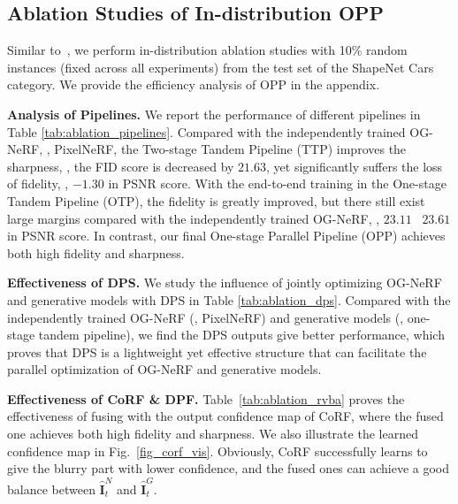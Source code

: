\subsection{\textbf{Ablation Studies of In-distribution OPP}}

\label{sec:ablation_OPP}
Similar to~\cite {PixelNeRF_yu2021pixelnerf}, we perform in-distribution ablation studies with 10\% random instances (fixed across all experiments) from the test set of the ShapeNet Cars category. We provide the efficiency analysis of OPP in the appendix.

\vspace{0.1cm}
\noindent\textbf{Analysis of Pipelines.}
We report the performance of different pipelines in Table \ref{tab:ablation_pipelines}. Compared with the independently trained OG-NeRF, \ie, PixelNeRF, the Two-stage Tandem Pipeline (TTP) improves the sharpness, \eg, the FID score is decreased by $21.63$, yet significantly suffers the loss of fidelity, \eg, $-1.30$ in PSNR score. With the end-to-end training in the One-stage Tandem Pipeline (OTP), the fidelity is greatly improved, but there still exist large margins compared with the independently trained OG-NeRF, \eg, $23.11$ \vs \  $23.61$ in PSNR score. In contrast, our final One-stage Parallel Pipeline (OPP) achieves both high fidelity and sharpness. 








\vspace{0.1cm}
\noindent\textbf{Effectiveness of DPS.}
We study the influence of jointly optimizing OG-NeRF and generative models with DPS in Table \ref{tab:ablation_dps}.  Compared with the independently trained OG-NeRF (\ie, PixelNeRF) and generative models (\ie, one-stage tandem pipeline), we find the DPS outputs give better performance, which proves that DPS is a lightweight yet effective structure that can facilitate the parallel optimization of OG-NeRF and generative models.

\vspace{0.1cm}
\noindent\textbf{Effectiveness of CoRF \& DPF.} Table~\ref{tab:ablation_rvba} proves the effectiveness of fusing with the output confidence map of CoRF, where the fused one achieves both high fidelity and sharpness. We also illustrate the learned confidence map in Fig.~\ref{fig_corf_vis}. Obviously, CoRF successfully learns to give the blurry part with lower confidence,  and the fused ones can achieve a good balance between $\hat{\textbf{I}}_t^{N}$ and  $\hat{\textbf{I}}_t^{G}$. 
